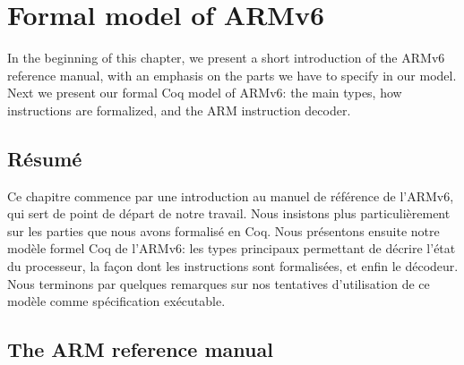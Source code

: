 \chapter{Formal model of ARMv6}
\label{cpt:formal}

In the beginning of this chapter,
we present a short introduction of the ARMv6 reference manual,
with an emphasis on the parts we have to specify in our model.
Next we present our formal Coq model of ARMv6:
the main types, how instructions are formalized,
and the ARM instruction decoder.

\section*{Résumé}
\begin{resume}
Ce chapitre commence par une introduction au manuel de référence de l'ARMv6,
qui sert de point de départ de notre travail.
Nous insistons plus particulièrement sur les parties que nous avons
formalisé en Coq.
Nous présentons ensuite notre modèle formel Coq de l'ARMv6:
les types principaux permettant de décrire l'état du processeur, 
la façon dont les instructions sont formalisées,
et enfin le décodeur.
Nous terminons par quelques remarques sur nos tentatives d'utilisation
de ce modèle comme spécification exécutable.
\end{resume}


\section{The ARM reference manual}
\label{sec:ref}

